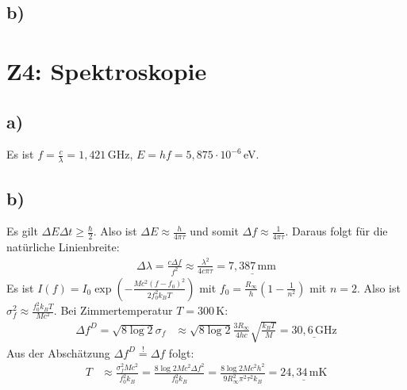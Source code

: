 \documentclass[a4paper,12pt]{article}
\newcommand{\kla}{}
\newcommand{\tecxt}{}
\begin{document}
\subsection*{b)}
\section*{Z4: Spektroskopie}
\subsection*{a)}
Es ist $f=\frac{c}{\lambda}=1,421\,$GHz, $E=hf=5,875\cdot 10^{-6}\,$eV.
\subsection*{b)}
Es gilt $\Delta E\Delta t\ge\frac{\hbar}{2}$. Also ist $\Delta E\approx \frac{h}{4\pi\tau}$ und somit $\Delta f\approx\frac{1}{4\pi\tau}$. Daraus folgt für die natürliche Linienbreite:
\begin{align*}
\Delta\lambda = \frac{c\Delta f}{f^2}\approx\frac{\lambda^2}{4c\pi\tau}=\underline{7,387\,\mathrm{mm}}
\end{align*}
Es ist $I(f)=I_0\exp\left( -\frac{Mc^2(f-f_0)^2}{2f_0^2k_BT} \right)$  mit $f_0=\frac{R_\infty}{h} \kla\left( {1-\frac{1}{n^2}} \right)$ mit $n=2$. Also ist $\sigma_f^2\approx \frac{f_0^2k_BT}{Mc^2}$. Bei Zimmertemperatur $T=300\,$K:
\begin{align*}
\Delta f^D=\sqrt{8\log 2}\sigma_f&\approx\sqrt{8\log 2} \frac{3R_\infty}{4hc}\sqrt{\frac{k_BT}{M}}=\underline{30,6\,\mathrm{GHz}}
\end{align*}
Aus der Abschätzung $\Delta f^D\overset{!}{=}\Delta f$ folgt:
\begin{align*}
T&\approx\frac{\sigma_f^2Mc^2}{f_0^2k_B}=\frac{8\log 2 Mc^2\Delta f^2}{f_0^2k_B}=\frac{8\log 2Mc^2h^2}{9R_\infty^2\pi^2\tau^2 k_B}=\underline{24,34\,\tecxt\text{mK}}
\end{align*}
\end{document}

